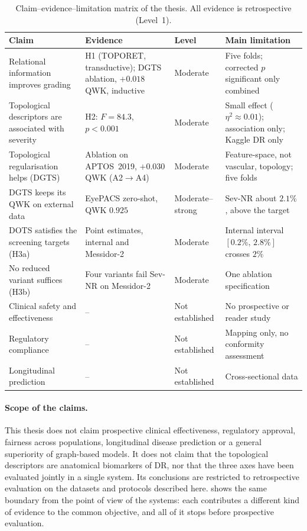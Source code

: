 \begin{table}[!htbp]
\centering
\caption[Claim--evidence--limitation matrix]{Claim--evidence--limitation matrix of the
thesis. All evidence is retrospective (Level~1).}
\label{tab:claimev}
\small
\begin{tabular}{@{}P{4.0cm}P{4.3cm}P{2.1cm}P{3.9cm}@{}}
\toprule
Claim & Evidence & Level & Main limitation \\
\midrule
Relational information improves grading & H1 (TOPORET, transductive); DGTS ablation, $+0.018$ QWK, inductive & Moderate & Five folds; corrected $p$ significant only combined \\
Topological descriptors are associated with severity & H2: $F=84.3$, $p<0.001$ & Moderate & Small effect ($\eta^2\approx0.01$); association only; Kaggle DR only \\
Topological regularisation helps (DGTS) & Ablation on APTOS~2019, $+0.030$ QWK (A2$\to$A4) & Moderate & Feature-space, not vascular, topology; five folds \\
DGTS keeps its QWK on external data & EyePACS zero-shot, QWK $0.925$ & Moderate--strong & Sev-NR about $2.1\%$, above the target \\
DOTS satisfies the screening targets (H3a) & Point estimates, internal and Messidor-2 & Moderate & Internal interval $[0.2\%,\,2.8\%]$ crosses $2\%$ \\
No reduced variant suffices (H3b) & Four variants fail Sev-NR on Messidor-2 & Moderate & One ablation specification \\
Clinical safety and effectiveness & -- & Not established & No prospective or reader study \\
Regulatory compliance & -- & Not established & Mapping only, no conformity assessment \\
Longitudinal prediction & -- & Not established & Cross-sectional data \\
\bottomrule
\end{tabular}
\end{table}

\paragraph{Scope of the claims.}
This thesis does not claim prospective clinical effectiveness, regulatory approval,
fairness across populations, longitudinal disease prediction or a general superiority of
graph-based models. It does not claim that the topological descriptors are anatomical
biomarkers of DR, nor that the three axes have been evaluated jointly in a single system.
Its conclusions are restricted to retrospective evaluation on the datasets and protocols
described here.  shows the same boundary from the point of view of the systems: each
contributes a different kind of evidence to the common objective, and all of it stops
before prospective evaluation.

